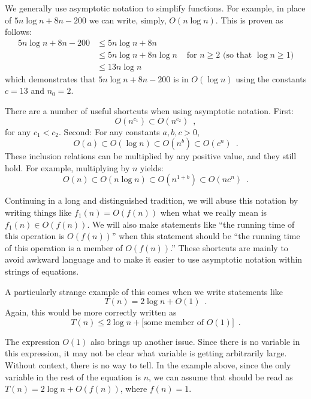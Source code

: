 We generally use asymptotic notation to simplify functions.  For example,
in place of $5n\log n + 8n - 200$ we can write, simply,  $O(n\log n)$.
This is proven as follows:
\begin{align*} 
       5n\log n + 8n - 200
        & \le 5n\log n + 8n \\
        & \le 5n\log n + 8n\log n & \mbox{ for $n\ge 2$ (so that $\log n \ge 1$)}
            \\
        & \le 13n\log n 
\end{align*}
which demonstrates that $5n\log n + 8n - 200$ is in $O(\log n)$ using the constants $c=13$ and $n_0 = 2$.

There are a number of useful shortcuts when using asymptotic notation.  First:
\[ O(n^{c_1}) \subset O(n^{c_2}) \enspace ,\]
 for any $c_1 < c_2$.  Second:
For any constants $a,b,c > 0$,
\[ O(a) \subset O(\log n) \subset O(n^{b}) \subset O({c}^n) \enspace . \]
These inclusion relations can be multiplied by any positive value, and they still hold. For example, multiplying by $n$ yields:
\[ O(n) \subset O(n\log n) \subset O(n^{1+b}) \subset O(n{c}^n) \enspace . \]

Continuing in a long and distinguished tradition,
we will abuse this notation by writing things
like $f_1(n) = O(f(n))$ when what we really mean is $f_1(n) \in O(f(n))$.
We will also make statements like ``the running time of this operation
is $O(f(n))$'' when this statement should be ``the running time of
this operation is a member of $O(f(n))$.''  These shortcuts are mainly
to avoid awkward language and to make it easier to use asymptotic
notation within strings of equations.

A particularly strange example of this comes when we write statements like
\[
     T(n) = 2\log n + O(1)  \enspace .
\]
Again, this would be more correctly written as
\[
     T(n) \le 2\log n + [\mbox{some member of $O(1)$]}  \enspace .
\]

The expression $O(1)$ also brings up another issue. Since there is
no variable in this expression, it may not be clear what variable is
getting arbitrarily large.  Without context, there is no way to tell.
In the example above, since the only variable in the rest of the equation
is $n$, we can assume that should be read as $T(n) = 2\log n + O(f(n))$,
where $f(n) = 1$.

